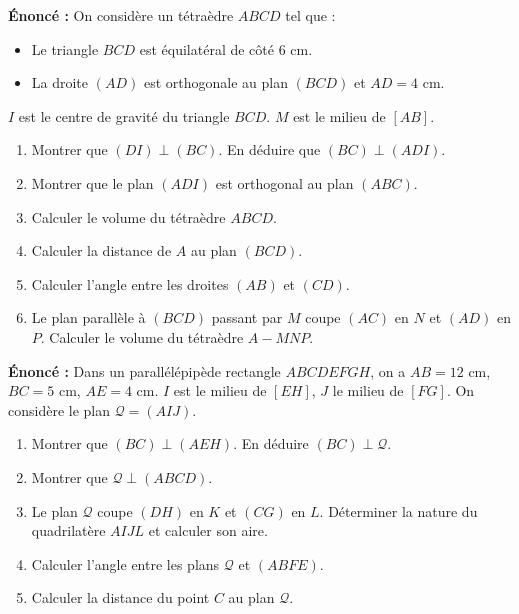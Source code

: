 \documentclass[11pt]{article}
\begin{document}
\begin{exercice}
\textbf{Énoncé :} On considère un tétraèdre $ABCD$ tel que :
\begin{itemize}
    \item Le triangle $BCD$ est équilatéral de côté $6$ cm.
    \item La droite $(AD)$ est orthogonale au plan $(BCD)$ et $AD = 4$ cm.
\end{itemize}
$I$ est le centre de gravité du triangle $BCD$. $M$ est le milieu de $[AB]$.
\begin{enumerate}
    \item Montrer que $(DI) \perp (BC)$. En déduire que $(BC) \perp (ADI)$.
    \item Montrer que le plan $(ADI)$ est orthogonal au plan $(ABC)$.
    \item Calculer le volume du tétraèdre $ABCD$.
    \item Calculer la distance de $A$ au plan $(BCD)$.
    \item Calculer l'angle entre les droites $(AB)$ et $(CD)$.
    \item Le plan parallèle à $(BCD)$ passant par $M$ coupe $(AC)$ en $N$ et $(AD)$ en $P$. Calculer le volume du tétraèdre $A-MNP$.
\end{enumerate}
\end{exercice}

\begin{exercice}
\textbf{Énoncé :} Dans un parallélépipède rectangle $ABCDEFGH$, on a $AB = 12$ cm, $BC = 5$ cm, $AE = 4$ cm. $I$ est le milieu de $[EH]$, $J$ le milieu de $[FG]$. On considère le plan $\mathcal{Q} = (AIJ)$.
\begin{enumerate}
    \item Montrer que $(BC) \perp (AEH)$. En déduire $(BC) \perp \mathcal{Q}$.
    \item Montrer que $\mathcal{Q} \perp (ABCD)$.
    \item Le plan $\mathcal{Q}$ coupe $(DH)$ en $K$ et $(CG)$ en $L$. Déterminer la nature du quadrilatère $AIJL$ et calculer son aire.
    \item Calculer l'angle entre les plans $\mathcal{Q}$ et $(ABFE)$.
    \item Calculer la distance du point $C$ au plan $\mathcal{Q}$.
\end{enumerate}
\end{exercice}
\end{document}
